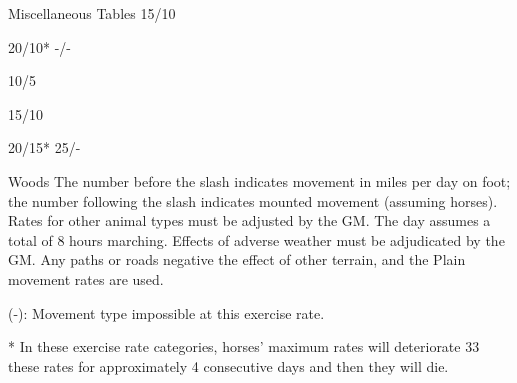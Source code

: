 \begin{Table}{Miscellaneous Tables}
15/10 

20/10*  -/- 

10/5 

15/10 

20/15*  25/- 

Woods 
The number before the slash indicates movement in miles per day on foot; the number following the slash 
indicates mounted movement (assuming horses). Rates for other animal types must be adjusted by the GM. 
The day assumes a total of 8 hours marching. Effects of adverse weather must be adjudicated by the GM. 
Any paths or roads negative the effect of other terrain, and the Plain movement rates are used. 

(-): Movement type impossible at this exercise rate. 

* In these exercise rate categories, horses’ maximum rates will deteriorate 33%
these rates for approximately 4 consecutive days and then they will die. 

\end{Table}
